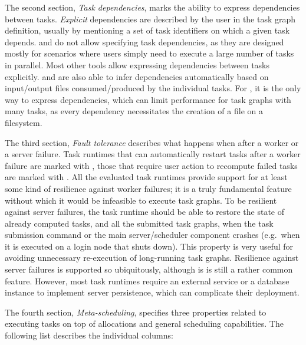 The second section, \emph{Task dependencies}, marks the ability to express dependencies between
tasks. \emph{Explicit} dependencies are described by the user in the task graph
definition, usually by mentioning a set of task identifiers on which a given task depends.
\gnuparallel{} and \hypershell{} do not allow specifying task dependencies, as
they are designed mostly for scenarios where users simply need to execute a large number of tasks
in parallel. Most other tools allow expressing dependencies between tasks explicitly.
\pegasus{} and \snakemake{} are also able to infer dependencies
automatically based on input/output files consumed/produced by the individual tasks. For
\snakemake{}, it is the only way to express dependencies, which can limit performance
for task graphs with many tasks, as every dependency necessitates the creation of a file on a
filesystem.

The third section, \emph{Fault tolerance} describes what happens when after a worker or a server
failure. Task runtimes that can automatically restart tasks after a worker failure are marked with
\automaticft, those that require user action to recompute failed tasks are marked with \manualft.
All the evaluated task runtimes provide support for at least some kind of resilience against worker
failures; it is a truly fundamental feature without which it would be infeasible to execute task
graphs. To be resilient against server failures, the task runtime should be able to restore the
state of already computed tasks, and all the submitted task graphs, when the task submission
command or the main server/scheduler component crashes (e.g.\ when it is executed on a login node
that shuts down). This property is very useful for avoiding unnecessary re-execution of
long-running task graphs. Resilience against server failures is supported so ubiquitously, although
is is still a rather common feature. However, most task runtimes require an external service or a
database instance to implement server persistence, which can complicate their deployment.

The fourth section, \emph{Meta-scheduling}, specifies three properties related to executing tasks
on top of allocations and general scheduling capabilities. The following list describes the
individual columns:

